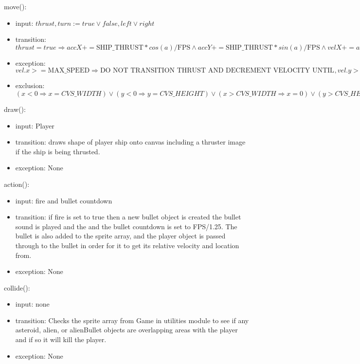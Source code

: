 \documentclass[12pt]{article}
\begin{document}
\noindent move():
\begin{itemize}
  \item input: $thrust, turn := true \lor false, left \lor right$
  \item transition: $thrust = true \Rightarrow accX += \mbox{SHIP\_THRUST} * cos(a)/\mbox{FPS} \land accY += \mbox{SHIP\_THRUST} * sin(a)/\mbox{FPS} \land velX += accX \land velY += accY, thrust = false \Rightarrow \mbox{DO NOTHING}, turn = right \Rightarrow rot = -\mbox{TURN\_SPEED}/180*\mbox{PI}/\mbox{FPS}, turn = left \Rightarrow rot =  \mbox{TURN\_SPEED}/180*\mbox{PI}/\mbox{FPS}, turn \lnot (right \lor left) \Rightarrow rot = 0,   space, left, right, down := thrust = true, fire = true, turn = left, turn = right, airbrake = true$
  \item exception: $vel.x >= \mbox{MAX\_SPEED} \Rightarrow \mbox{DO NOT TRANSITION THRUST AND DECREMENT VELOCITY UNTIL IT IS BELOW MAX SPEED}, vel.y >= max \Rightarrow \mbox{DO NOT TRANSITION THRUST AND DECREMENT VELOCITY UNTIL IT IS BELOW MAX SPEED}$
  \item exclusion: $(x < 0 \Rightarrow x = CVS\_WIDTH) \lor (y < 0 \Rightarrow y = CVS\_HEIGHT) \lor (x > CVS\_WIDTH \Rightarrow x = 0) \lor (y > CVS\_HEIGHT \Rightarrow y = 0)$
\end{itemize}

\noindent draw():
\begin{itemize}
  \item input: Player
  \item transition: draws shape of player ship onto canvas including a thruster image if the ship is being thrusted.
  \item exception: None
\end{itemize}

\noindent action():
\begin{itemize}
  \item input: fire and bullet countdown
  \item transition: if fire is set to true then a new bullet object is created the bullet sound is played and the and the bullet countdown is set to FPS/1.25. The bullet is also added to the sprite array, and the player object is passed through to the bullet in order for it to get its relative velocity and location from.
  \item exception: None
\end{itemize}

\noindent collide():
\begin{itemize}
  \item input: none
  \item transition: Checks the sprite array from Game in utilities module to see if any asteroid, alien, or alienBullet objects are overlapping areas with the player and if so it will kill the player.
  \item exception: None
\end{itemize}
\end{document}
